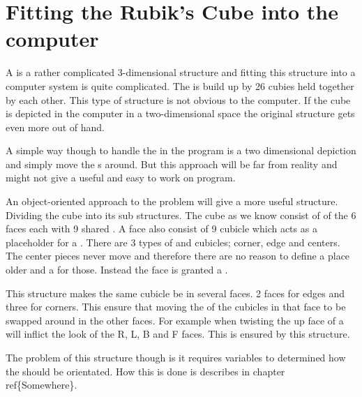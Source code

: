 \chapter{Fitting the Rubik's Cube into the computer}
A \rubik{} is a rather complicated 3-dimensional structure and fitting this structure into a computer system is quite complicated. The \rubik{} is build up by 26 cubies held together by each other. This type of structure is not obvious to the computer. If the cube is depicted in the computer in a two-dimensional space the original \rubik{} structure gets even more out of hand. 

A simple way though to handle the \rubik{} in the program is a two dimensional depiction and simply move the \facelet{}s around. But this approach will be far from reality and might not give a useful and easy to work on program. 

An object-oriented approach to the problem will give a more useful structure. Dividing the cube into its sub structures. The cube as we know consist of of the 6 faces each with 9 shared \cpiece{}. A face also consist of 9 cubicle which acts as a placeholder for a  \cpiece{}. There are 3 types of \cpiece{} and cubicles; corner, edge and centers. The center pieces never move and therefore there are no reason to define a place older and a \cipeice{} for those. Instead the face is granted a \facelet{}.

This structure makes the same cubicle be in several faces. 2 faces for edges and three for corners. This ensure that moving the \cpiece{} of the cubicles in that face to be swapped around in the other faces. For example when twisting the up face of a \rubik{} will inflict the look of the R, L, B and F faces. This is ensured by this structure. 

The problem of this structure though is it requires variables to determined how the \facelet{} should be orientated. How this is done is describes in chapter ref\{Somewhere\}.
